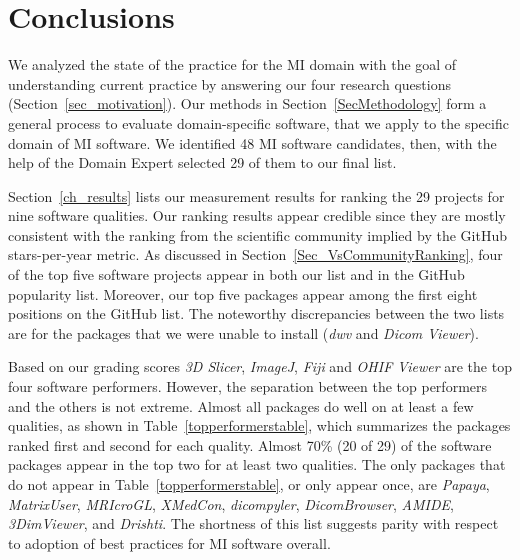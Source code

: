 \documentclass[11pt]{article}
\begin{document}
\section{Conclusions} \label{ch_conclusions}

We analyzed the state of the practice for the MI domain with the goal of
understanding current practice by answering our four research questions
(Section~\ref{sec_motivation}).  Our methods in Section~\ref{SecMethodology} form a
general process to evaluate domain-specific software, that we apply to the
specific domain of MI software. We identified 48 MI software candidates, then,
with the help of the Domain Expert selected 29 of them to our final list. 

Section~\ref{ch_results} lists our measurement results for ranking the 29
projects for nine software qualities. Our ranking results appear credible since
they are mostly consistent with the ranking from the scientific community
implied by the GitHub stars-per-year metric. As discussed in
Section~\ref{Sec_VsCommunityRanking}, four of the top five software projects
appear in both our list and in the GitHub popularity list.  Moreover, our top
five packages appear among the first eight positions on the GitHub list.  The
noteworthy discrepancies between the two lists are for the packages that we were
unable to install (\textit{dwv} and \textit{Dicom Viewer}).

Based on our grading scores \textit{3D Slicer}, \textit{ImageJ}, \textit{Fiji}
and \textit{OHIF Viewer} are the top four software performers.  However, the
separation between the top performers and the others is not extreme.  Almost all
packages do well on at least a few qualities, as shown in
Table~\ref{topperformerstable}, which summarizes the packages ranked first and
second for each quality. Almost 70\% (20 of 29) of the software packages appear
in the top two for at least two qualities.  The only packages that do not appear
in Table~\ref{topperformerstable}, or only appear once, are \textit{Papaya},
\textit{MatrixUser}, \textit{MRIcroGL}, \textit{XMedCon}, \textit{dicompyler},
\textit{DicomBrowser}, \textit{AMIDE}, \textit{3DimViewer}, and
\textit{Drishti}. The shortness of this list suggests parity with respect to
adoption of best practices for MI software overall.
\end{document}
